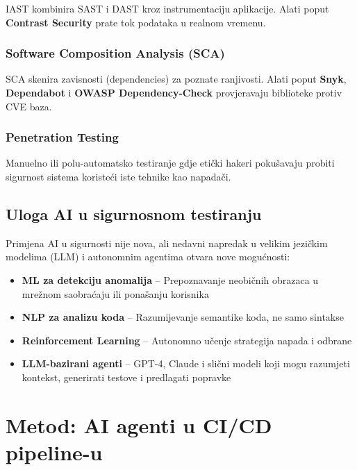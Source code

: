 \documentclass[12pt,a4paper]{article}
\begin{document}
IAST kombinira SAST i DAST kroz instrumentaciju aplikacije. Alati poput \textbf{Contrast Security} prate tok podataka u realnom vremenu.

\subsubsection{Software Composition Analysis (SCA)}

SCA skenira zavisnosti (dependencies) za poznate ranjivosti. Alati poput \textbf{Snyk}, \textbf{Dependabot} i \textbf{OWASP Dependency-Check} provjeravaju biblioteke protiv CVE baza.

\subsubsection{Penetration Testing}

Manuelno ili polu-automatsko testiranje gdje etički hakeri pokušavaju probiti sigurnost sistema koristeći iste tehnike kao napadači.

\subsection{Uloga AI u sigurnosnom testiranju}

Primjena AI u sigurnosti nije nova, ali nedavni napredak u velikim jezičkim modelima (LLM) i autonomnim agentima otvara nove mogućnosti:

\begin{itemize}
    \item \textbf{ML za detekciju anomalija} -- Prepoznavanje neobičnih obrazaca u mrežnom saobraćaju ili ponašanju korisnika
    \item \textbf{NLP za analizu koda} -- Razumijevanje semantike koda, ne samo sintakse
    \item \textbf{Reinforcement Learning} -- Autonomno učenje strategija napada i odbrane
    \item \textbf{LLM-bazirani agenti} -- GPT-4, Claude i slični modeli koji mogu razumjeti kontekst, generirati testove i predlagati popravke
\end{itemize}

\section{Metod: AI agenti u CI/CD pipeline-u}
\end{document}

